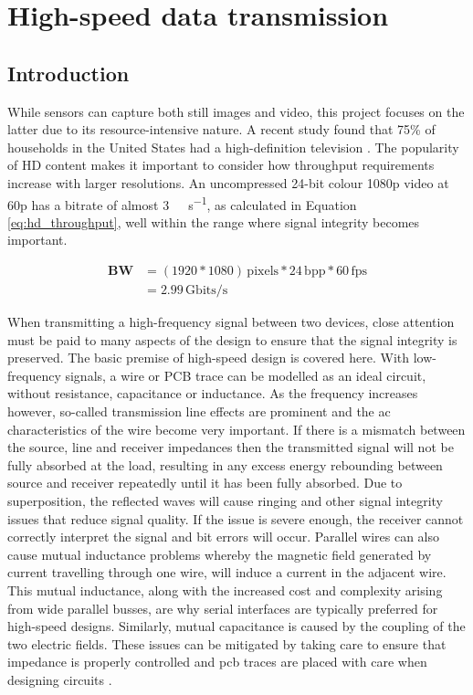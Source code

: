 \chapter{High-speed data transmission}

\section{Introduction}

While sensors can capture both still images and video, this project focuses on the latter due to its resource-intensive nature. A recent study found that 75\% of households in the United States had a high-definition television \cite{14_leichtman_research_group_2013}. The popularity of HD content makes it important to consider how throughput requirements increase with larger resolutions. An uncompressed 24-bit colour 1080p video at 60p has a bitrate of almost \SI{3}{\giga\bits\per\second}, as calculated in Equation \ref{eq:hd_throughput}, well within the range where signal integrity becomes important.

\begin{equation}
  \begin{split}
    \mathbf{BW} &= (1920*1080) \, \mathrm{pixels} * 24  \, \mathrm{bpp} * 60 \, \mathrm{fps} \\
                &= 2.99  \, \mathrm{Gbits/s}
  \end{split}  
  \label{eq:hd_throughput}
\end{equation}

When transmitting a high-frequency signal between two devices, close attention must be paid to many aspects of the design to ensure that the signal integrity is preserved. The basic premise of high-speed design is covered here. With low-frequency signals, a wire or PCB trace can be modelled as an ideal circuit, without resistance, capacitance or inductance. As the frequency increases however, so-called transmission line effects are prominent and the \gls{ac} characteristics of the wire become very important. If there is a mismatch between the source, line and receiver impedances then the transmitted signal will not be fully absorbed at the load, resulting in any excess energy rebounding between source and receiver repeatedly until it has been fully absorbed. Due to superposition, the reflected waves will cause ringing and other signal integrity issues that reduce signal quality. If the issue is severe enough, the receiver cannot correctly interpret the signal and bit errors will occur. Parallel wires can also cause mutual inductance problems whereby the magnetic field generated by current travelling through one wire, will induce a current in the adjacent wire. This mutual inductance, along with the increased cost and complexity arising from wide parallel busses, are why serial interfaces are typically preferred for high-speed designs. Similarly, mutual capacitance is caused by the coupling of the two electric fields. These issues can be mitigated by taking care to ensure that impedance is properly controlled and \gls{pcb} traces are placed with care when designing circuits \cite{15_basic_principles_of_signal_integrity_2007}.

